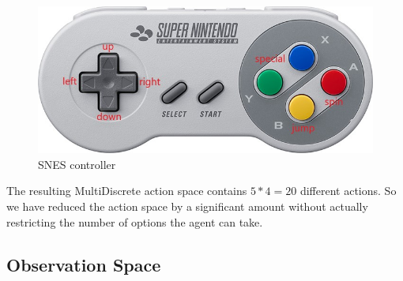 \documentclass{article}
\begin{document}
\begin{figure}[ht]
    \centering
    \includegraphics[width=.75\textwidth]{snes-controller-annot}
    \caption{SNES controller}
    \label{fig:snes-controller}
\end{figure}
The resulting MultiDiscrete action space contains $5*4 = 20$ different actions.
So we have reduced the action space by a significant amount without actually restricting the number of options the agent can take.

\subsection{Observation Space}
\end{document}
